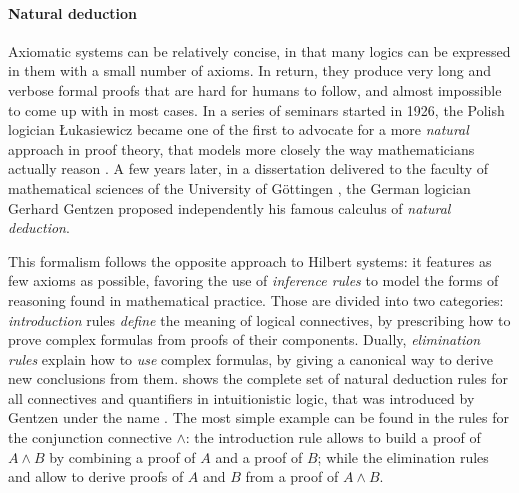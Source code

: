 \paragraph{Natural deduction}

Axiomatic systems can be relatively concise, in that many logics can be
expressed in them with a small number of axioms. In return, they produce very
long and verbose formal proofs that are hard for humans to follow, and almost
impossible to come up with in most cases. In a series of seminars started in
1926, the Polish logician Łukasiewicz became one of the first to advocate for a
more \emph{natural} approach in proof theory, that models more closely the way
mathematicians actually reason . A few years
later, in a dissertation delivered to the faculty of mathematical sciences of
the University of Göttingen , the German
logician Gerhard Gentzen proposed independently his famous calculus of
\emph{natural deduction}.

This formalism follows the opposite approach to Hilbert systems: it features as
few axioms as possible, favoring the use of \emph{inference rules} to model the
forms of reasoning found in mathematical practice. Those are divided into two
categories: \emph{introduction} rules \emph{define} the meaning of logical
connectives, by prescribing how to prove complex formulas from proofs of their
components. Dually, \emph{elimination rules} explain how to \emph{use} complex
formulas, by giving a canonical way to derive new conclusions from them.
 shows the complete set of natural deduction rules for all
connectives and quantifiers in intuitionistic logic, that was introduced by
Gentzen under the name  \cite{gentzen_untersuchungen_1935}. The most simple example can be
found in the rules for the conjunction connective $\land$: the introduction rule
 allows to build a proof of $A \land B$ by combining a proof of $A$
and a proof of $B$; while the elimination rules  and  allow to derive proofs of $A$ and $B$ from a proof of $A \land B$.

